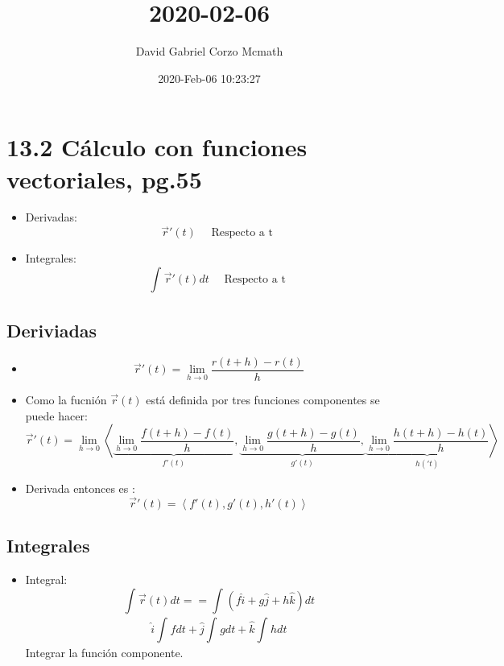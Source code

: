 \documentclass{article}
\title{2020-02-06}
\author{David Gabriel Corzo Mcmath}
\date{2020-Feb-06 10:23:27}
\begin{document}
\maketitle

\section{13.2 Cálculo con funciones vectoriales, pg.55}
\begin{itemize}
    \item Derivadas:
        \[
          \vec{r}'(t) \quad \text{  Respecto a t  }
        \]
    
    \item Integrales:
        \[
          \int_{}^{}\vec{r}'(t)dt \quad \text{  Respecto a t  }
        \]
\end{itemize}


\subsection{Deriviadas}
\begin{itemize}
    \item \[
      \vec{r}'(t) = \lim_{h \to 0} \frac{r(t+h)-r(t)}{h} 
    \]
    
    \item Como la fucnión $\vec{r}(t)$ está definida por tres funciones componentes se puede hacer: 
        \[
          \vec{r}'(t) = \lim_{h \to 0} \left\langle 
          \underbrace{\lim_{h \to 0} \frac{f(t+h)-f(t)}{h}}_{f'(t)}, 
          \underbrace{\lim_{h \to 0} \frac{g(t+h)-g(t)}{h}, }_{g'(t)}
          \underbrace{\lim_{h \to 0} \frac{h(t+h)-h(t)}{h}  }_{h('t)}
          \right\rangle 
        \]
    
    \item Derivada entonces es : 
        \[
          \vec{r}'(t) = \left\langle f'(t),g'(t),h'(t) \right\rangle 
        \]
\end{itemize}


\subsection{Integrales}
\begin{itemize}
    \item Integral:
        \[
          \int_{}^{}\vec{r}(t)dt = = \int_{}^{}(f \hat{i} + g \hat{j} + h \hat{k} )dt
        \]
        \[
          \hat{i} \int_{}^{}fdt + \hat{j} \int_{}^{}gdt + \hat{k} \int_{}^{}hdt 
        \]
        Integrar la función componente.
\end{itemize}
\end{document}
